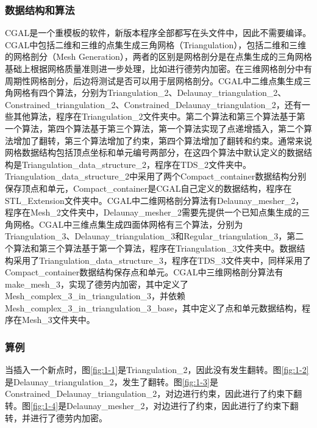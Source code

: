 \subsubsection{数据结构和算法}
CGAL是一个重模板的软件，新版本程序全部都写在头文件中，因此不需要编译。CGAL中包括二维和三维的点集生成三角网格（Triangulation），包括二维和三维的网格剖分（Mesh Generation），两者的区别是网格剖分是在点集生成的三角网格基础上根据网格质量准则进一步处理，比如进行德劳内加密。在三维网格剖分中有周期性网格剖分，后边将测试是否可以用于层网格剖分。CGAL中二维点集生成三角网格有四个算法，分别为Triangulation\_2、Delaunay\_triangulation\_2、Constrained\_triangulation\_2、Constrained\_Delaunay\_triangulation\_2，还有一些其他算法，程序在Triangulation\_2文件夹中。第二个算法和第三个算法基于第一个算法，第四个算法基于第三个算法，第一个算法实现了点递增插入，第二个算法增加了翻转，第三个算法增加了约束，第四个算法增加了翻转和约束。通常来说网格数据结构包括顶点坐标和单元编号两部分，在这四个算法中默认定义的数据结构是Triangulation\_data\_structure\_2，程序在TDS\_2文件夹中。Triangulation\_data\_structure\_2中采用了两个Compact\_container数据结构分别保存顶点和单元，Compact\_container是CGAL自己定义的数据结构，程序在STL\_Extension文件夹中。CGAL中二维网格剖分算法有Delaunay\_mesher\_2，程序在Mesh\_2文件夹中，Delaunay\_mesher\_2需要先提供一个已知点集生成的三角网格。CGAL中三维点集生成四面体网格有三个算法，分别为Triangulation\_3、Delaunay\_triangulation\_3和Regular\_triangulation\_3，第二个算法和第三个算法基于第一个算法，程序在Triangulation\_3文件夹中。数据结构采用了Triangulation\_data\_structure\_3，程序在TDS\_3文件夹中，同样采用了Compact\_container数据结构保存点和单元。CGAL中三维网格剖分算法有make\_mesh\_3，实现了德劳内加密，其中定义了Mesh\_complex\_3\_in\_triangulation\_3，并依赖Mesh\_complex\_3\_in\_triangulation\_3\_base，其中定义了点和单元数据结构，程序在Mesh\_3文件夹中。

\subsubsection{算例}
当插入一个新点时，图\ref{fig:1-1}是Triangulation\_2，因此没有发生翻转。图\ref{fig:1-2}是Delaunay\_triangulation\_2，发生了翻转。图\ref{fig:1-3}是Constrained\_Delaunay\_triangulation\_2，对边进行约束，因此进行了约束下翻转。图\ref{fig:1-4}是Delaunay\_mesher\_2，对边进行了约束，因此进行了约束下翻转，并进行了德劳内加密。

